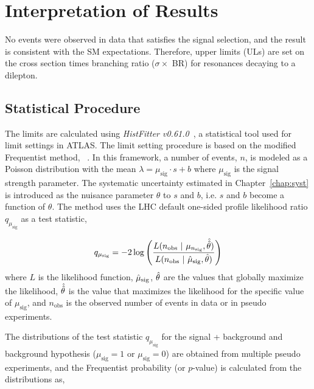\chapter{Interpretation of Results}
\label{chap:upper_limit}

No events were observed in data that satisfies the signal selection, and the result is consistent with the SM expectations. Therefore, upper limits (ULs) are set on the cross section times branching ratio ($\sigma \times$ BR) for resonances decaying to a dilepton.

\section{Statistical Procedure}
The limits are calculated using \textit{HistFitter v0.61.0}~\cite{Baak:2014wma}, a statistical tool used for limit settings in ATLAS. The limit setting procedure is based on the modified Frequentist method, \CLs~\cite{OBRAZTSOV1992388,PhysRevD.57.3873}. In this framework, a number of events, $n$, is modeled as a Poisson distribution with the mean $\lambda = \mu_{\mathrm{sig}}\cdot s + b$ where $\mu_{\mathrm{sig}}$ is the signal strength parameter. The systematic uncertainty estimated in Chapter~\ref{chap:syst} is introduced as the nuisance parameter $\theta$ to $s$ and $b$, i.e. $s$ and $b$ become a function of $\theta$. The method uses the LHC default one-sided profile likelihood ratio $q_{\mu_{\mathrm{sig}}}$ as a test statistic,

\begin{equation}
q_{\mu_{\mathrm{sig}}} = -2 \log \Bigg( \dfrac{L(n_\mathrm{obs}~|~\mu_{n_\mathrm{sig}}, \Hat{\Hat{\theta}})}{L(n_\mathrm{obs}~|~\Hat{\mu}_{\mathrm{sig}}, \Hat{\theta})}\Bigg)
\label{eq:test_statistic}
\end{equation}
%
where $L$ is the likelihood function, $\Hat{\mu}_{\mathrm{sig}}$, $\Hat{\theta}$ are the values that globally maximize the likelihood, $\Hat{\Hat{\theta}}$ is the value that maximizes the likelihood for the specific value of $\mu_{\mathrm{sig}}$, and $n_{\mathrm{obs}}$ is the observed number of events in data or in pseudo experiments.

The distributions of the test statistic $q_{\mu_{\mathrm{sig}}}$ for the signal + background and background hypothesis ($\mu_{\mathrm{sig}} = 1$ or $\mu_{\mathrm{sig}} = 0$) are obtained from multiple pseudo experiments, and the Frequentist probability (or $p$-value) is calculated from the distributions as,

